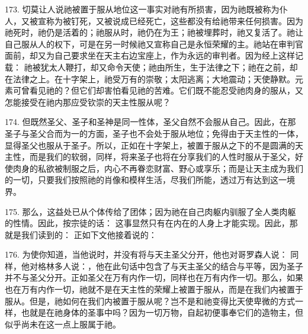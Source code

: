 173. 切莫让人说祂被置于服从地位这一事实对祂有所损害，因为祂既被称为仆人，又被宣称为被钉死，又被说成已经死亡，这些都没有给祂带来任何损害。因为祂死时，祂仍是活着的；祂服从时，祂仍在为王；祂被埋葬时，祂又复活了。祂让自己服从人的权下，可是在另一时候祂又宣称自己是永恒荣耀的主。祂站在审判官面前，却又为自己要求坐在天主右边宝座上，作为永远的审判者。因为经上这样记载： 祂被犹太人鞭打，却又命令天使；祂由所生，生于法律之下；祂在之前，却在法律之上。在十字架上，祂受万有的崇敬；太阳逃离；大地震动；天使静默。元素可曾看见祂的？但它们却害怕看见祂的苦难。它们既不能忍受祂肉身的服从，又怎能接受在祂内那应受钦崇的天主性服从呢？\par

174. 但既然圣父、圣子和圣神是同一性体，圣父自然不会服从自己。因此，在那圣子与圣父合而为一的方面，圣子也不会处于服从地位；免得由于天主性的一体，显得圣父也服从于圣子。所以，正如在十字架上，被置于服从之下的不是圆满的天主性，而是我们的软弱，同样，将来圣子也将在分享我们的人性时服从于圣父，好使肉身的私欲被制服之后，内心不再眷恋财富、野心或享乐；而是让天主成为我们的一切，只要我们按照祂的肖像和模样生活，尽我们所能，透过万有达到这一境界。\par

175. 那么，这益处已从个体传给了团体；因为祂在自己肉躯内驯服了全人类肉躯的性情。因此，按宗徒的话： 这事显然只有在内在的人身上才能实现。因此，那就是我们读到的： 正如下文他接着说的：\par

176. 为使你知道，当他说时，并没有将与天主圣父分开，他也对哥罗森人说： 同样，他对格林多人说：，他在此句话中包含了与天主圣父的结合与平等，因为圣子并不与圣父分开。正如圣父在万有内作一切，同样也在万有内作一切。那么，如果也在万有内作一切，祂就不是在天主性的荣耀上被置于服从，而是在我们内被置于服从。但是，祂如何在我们内被置于服从呢？岂不是和祂变得比天使卑微的方式一样，也就是在祂身体的圣事中吗？因为一切万物，自起初便事奉它们的造物主，但似乎尚未在这一点上服属于祂。\par

